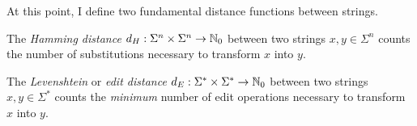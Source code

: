 %

At this point, I define two fundamental distance functions between strings.

\begin{definition}
\label{def:hamming}
\citep{Hamming1950} The \emph{Hamming distance} $d_H : \Sigma^{n} \times \Sigma^{n} \rightarrow \mathbb {N}_0$ between two strings $x,y \in \Sigma^{n}$ counts the number of substitutions necessary to transform $x$ into $y$.
\end{definition}

\begin{definition}
\label{def:edit}
\citep{Levenshtein1966} The \emph{Levenshtein} or \emph{edit distance} $d_E : \Sigma^{*} \times \Sigma^{*} \rightarrow \mathbb {N}_0$ between two strings $x,y \in \Sigma^{*}$ counts the \emph{minimum} number of edit operations necessary to transform $x$ into $y$.
\end{definition}

